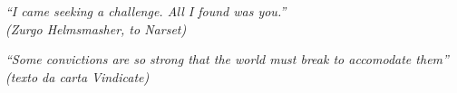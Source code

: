 \begin{epigrafe}
    \vspace*{\fill}
	\begin{flushright}
		\textit{ “I came seeking a challenge. All I found was you.”\\
   (Zurgo Helmsmasher, to Narset)} \vspace*{\fill}
   
      \textit{ “Some convictions are so strong that the world must break to accomodate them”\\
   (texto da carta Vindicate)} \vspace*{\fill}
	\end{flushright}
\end{epigrafe}

